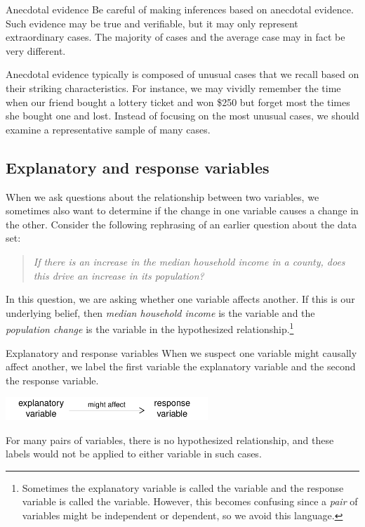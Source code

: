 \begin{onebox}{Anecdotal evidence}
Be careful of making inferences based on anecdotal evidence. Such evidence may be true and verifiable, but it may only represent extraordinary cases. The majority of cases and the average case may in fact be very different.\end{onebox}

Anecdotal evidence typically is composed of unusual cases that we recall based on their striking characteristics. For instance, we may vividly remember the time when our friend bought a lottery ticket and won \$250 but forget most the times she bought one and lost. Instead of focusing on the most unusual cases, we should examine a representative sample of many cases.


\D{\newpage}

\subsection{Explanatory and response variables}
\label{explanatoryAndResponse}


When we ask questions about the relationship
between two variables, we sometimes also want to determine
if the change in one variable causes a change in the other.
Consider the following rephrasing of an earlier question
about the  data set:
\begin{quote}\em
  If there is an increase in the median household income
  in a county, does this drive an increase in its population?
\end{quote}
In this question, we are asking whether one variable
affects another.
If this is our underlying belief,
then \emph{median household income} is the
variable and the \emph{population change} is the
 variable
in the hypothesized relationship.\footnote{Sometimes
  the explanatory variable is called the 
  variable and the response variable is called the
   variable.
  However, this becomes confusing since a \emph{pair}
  of variables might be independent or dependent,
  so we avoid this language.}


\begin{onebox}{Explanatory and response variables}
When we suspect one variable might causally affect another,
we label the first variable the explanatory variable and the
second the response variable.
\vspace{1mm}

\hspace{10mm}\includegraphics[height=0.34in]{ch_data_collection/figures/expResp/expResp}

For many pairs of variables, there is no hypothesized
relationship, and these labels would not be applied to
either variable in such cases.
\end{onebox}

